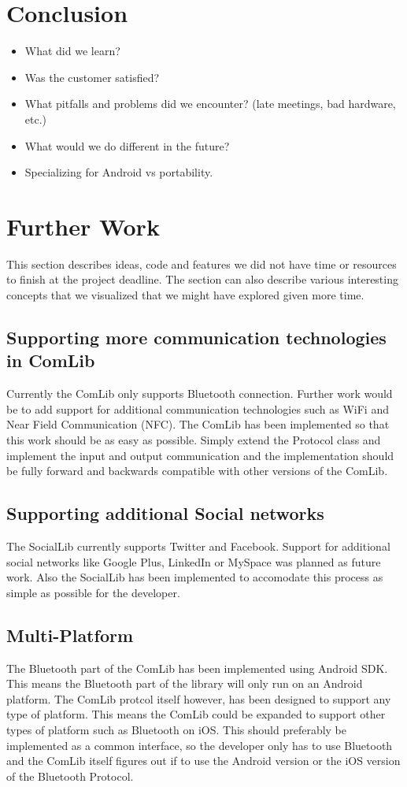 \section{Conclusion}
\begin{itemize}
\item What did we learn?
\item Was the customer satisfied?
\item What pitfalls and problems did we encounter? (late meetings, bad hardware, etc.)
\item What would we do different in the future?
\item Specializing for Android vs portability.
\end{itemize}

\section{Further Work}
This section describes ideas, code and features we did not have time or resources to
finish at the project deadline. The section can also describe various interesting concepts 
that we visualized that we might have explored given more time.

\subsection{Supporting more communication technologies in ComLib}
Currently the ComLib only supports Bluetooth connection. Further work would be
to add support for additional communication technologies such as WiFi and Near Field 
Communication (NFC). The ComLib has been implemented so that this work should
be as easy as possible. Simply extend the Protocol class and implement the input and
output communication and the implementation should be fully forward and backwards
compatible with other versions of the ComLib.

\subsection{Supporting additional Social networks}
The SocialLib currently supports Twitter and Facebook. Support for additional social
networks like Google Plus, LinkedIn or MySpace was planned as future work. Also the
SocialLib has been implemented to accomodate this process as simple as possible
for the developer.

\subsection{Multi-Platform}
The Bluetooth part of the ComLib has been implemented using Android SDK. This means 
the Bluetooth part of the library will only run on an Android platform. The ComLib protcol
itself however, has been designed to support any type of platform. This means the ComLib
could be expanded to support other types of platform such as Bluetooth on iOS. This
should preferably be implemented as a common interface, so the developer only has to use
Bluetooth and the ComLib itself figures out if to use the Android version or the iOS version of
the Bluetooth Protocol.

